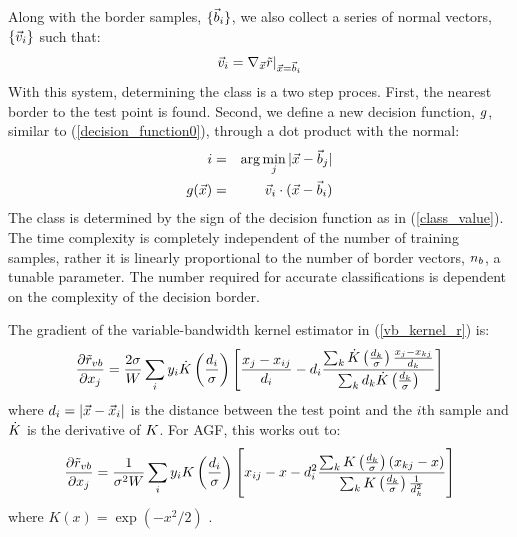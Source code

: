 \documentclass[11pt]{article}
\begin{document}
Along with the border samples,  $\lbrace \vec b_i \rbrace$, we also
collect a series of normal vectors, $\lbrace \vec v_i \rbrace$
such that:
\begin{equation}
\vec v_i=\nabla_{\vec {x}}{\tilde r |_{\vec {x}=\vec b_i}}
\end{equation}
With this system, determining the class is a two step proces.
First, the nearest border to the test point is found.
Second, we define a new decision function, $g$, 
similar to (\ref{decision_function0}), through a dot product with the normal:
\begin{eqnarray}
	i & = & \arg \min_j |\vec {x} - \vec b_j| \\ \nonumber
	g(\vec {x}) & = & \vec v_i \cdot (\vec {x} - \vec b_i)
	\label{border_decision}
\end{eqnarray}
The class is determined by the sign of the decision function as in 
(\ref{class_value}).
The time complexity is completely independent of the number
of training samples, rather it is linearly proportional to the number of
border vectors, $n_b$, a tunable parameter. The number required for
accurate classifications is dependent on the complexity of the decision
border.

The gradient of the variable-bandwidth kernel estimator in 
(\ref{vb_kernel_r}) is:
\begin{equation}
	\frac{\partial \tilde r_{vb}}{\partial x_j} = 
	\frac{2 \sigma}{W} \sum_i y_i
	\dot {K} \left (\frac{d_i}{\sigma} \right )
	\left [\frac{x_j - x_{ij}}{d_i} 
	- d_i \frac{\sum_k \dot {K} \left (\frac{d_k}{\sigma} \right )
	\frac{x_j - x_{kj}}{d_k}}
{\sum_k d_k \dot {K} \left (\frac{d_k}{\sigma} \right )} \right ]
\end{equation}
where $d_i=|\vec {x} - \vec {x}_i|$ is the distance between the 
test point and the $i$th sample and $\dot {K}$ is the derivative
of $K$.
For AGF, this works out to:
\begin{equation}
	\frac{\partial \tilde r_{vb}}{\partial x_j} = 
	\frac{1}{\sigma^2 W} \sum_i y_i
	K \left (\frac{d_i}{\sigma} \right )
	\left [x_{ij} - x
	- d_i^2 \frac{\sum_k K \left (\frac{d_k}{\sigma} \right )
	\left (x_{kj} - x \right )}
{\sum_k K \left (\frac{d_k}{\sigma} \right )\frac{1}{d_k^2}} \right ]
\end{equation}
where $K(x)=\exp(-x^2/2)$ \citep{Mills2011}.
\end{document}
